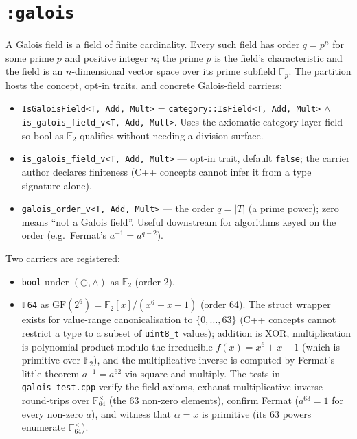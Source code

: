 \documentclass[11pt, a4paper]{report}
\begin{document}
\section{\texttt{:galois}}
\label{sec:algebra-galois}

A Galois field is a field of finite cardinality. Every such field has order $q = p^n$ for some prime $p$ and positive integer $n$; the prime $p$ is the field's characteristic and the field is an $n$-dimensional vector space over its prime subfield $\mathbb{F}_p$. The partition hosts the concept, opt-in traits, and concrete Galois-field carriers:

\begin{itemize}
  \item \texttt{IsGaloisField<T, Add, Mult>} = \texttt{category::IsField<T, Add, Mult>} $\wedge$ \texttt{is\_galois\_field\_v<T, Add, Mult>}. Uses the axiomatic category-layer field so bool-as-$\mathbb{F}_2$ qualifies without needing a division surface.
  \item \texttt{is\_galois\_field\_v<T, Add, Mult>} --- opt-in trait, default \texttt{false}; the carrier author declares finiteness (C++ concepts cannot infer it from a type signature alone).
  \item \texttt{galois\_order\_v<T, Add, Mult>} --- the order $q = |T|$ (a prime power); zero means ``not a Galois field''. Useful downstream for algorithms keyed on the order (e.g.\ Fermat's $a^{-1} = a^{q-2}$).
\end{itemize}

Two carriers are registered:

\begin{itemize}
  \item \texttt{bool} under $(\oplus, \wedge)$ as $\mathbb{F}_2$ (order 2).
  \item \texttt{𝔽64} as $\mathrm{GF}(2^6) = \mathbb{F}_2[x]/(x^6 + x + 1)$ (order 64). The struct wrapper exists for value-range canonicalisation to $\{0, \ldots, 63\}$ (C++ concepts cannot restrict a type to a subset of \texttt{uint8\_t} values); addition is XOR, multiplication is polynomial product modulo the irreducible $f(x) = x^6 + x + 1$ (which is primitive over $\mathbb{F}_2$), and the multiplicative inverse is computed by Fermat's little theorem $a^{-1} = a^{62}$ via square-and-multiply. The tests in \texttt{galois\_test.cpp} verify the field axioms, exhaust multiplicative-inverse round-trips over $\mathbb{F}_{64}^{\times}$ (the 63 non-zero elements), confirm Fermat ($a^{63} = 1$ for every non-zero $a$), and witness that $\alpha = x$ is primitive (its 63 powers enumerate $\mathbb{F}_{64}^{\times}$).
\end{itemize}
\end{document}
